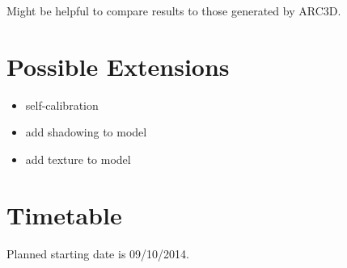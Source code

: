  Might be helpful to compare results to those generated by ARC3D.
 
\section*{Possible Extensions}
\begin{itemize}
\item self-calibration
\item add shadowing to model
\item add texture to model
\end{itemize}

\section*{Timetable}

Planned starting date is 09/10/2014.

